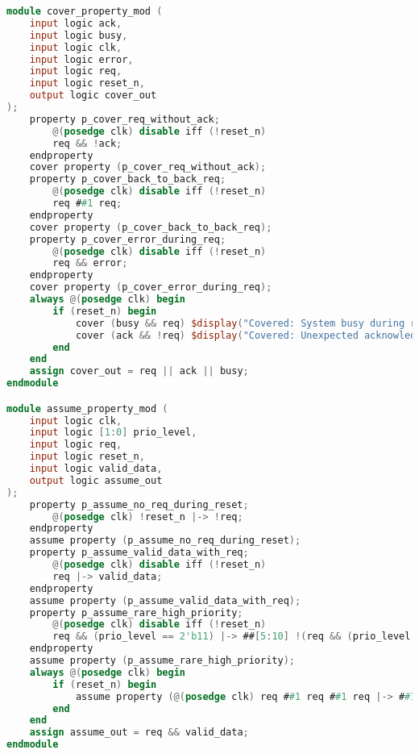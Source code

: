 \begin{lstlisting}[language=verilog,caption={Example of a snippet that targets Yosys's handling of assert and assume constructs.},label={lst:assert},breaklines=true]
module cover_property_mod (
    input logic ack,
    input logic busy,
    input logic clk,
    input logic error,
    input logic req,
    input logic reset_n,
    output logic cover_out
);
    property p_cover_req_without_ack;
        @(posedge clk) disable iff (!reset_n)
        req && !ack;
    endproperty
    cover property (p_cover_req_without_ack);
    property p_cover_back_to_back_req;
        @(posedge clk) disable iff (!reset_n)
        req ##1 req;
    endproperty
    cover property (p_cover_back_to_back_req);
    property p_cover_error_during_req;
        @(posedge clk) disable iff (!reset_n)
        req && error;
    endproperty
    cover property (p_cover_error_during_req);
    always @(posedge clk) begin
        if (reset_n) begin
            cover (busy && req) $display("Covered: System busy during request");
            cover (ack && !req) $display("Covered: Unexpected acknowledge");
        end
    end
    assign cover_out = req || ack || busy;
endmodule

module assume_property_mod (
    input logic clk,
    input logic [1:0] prio_level,
    input logic req,
    input logic reset_n,
    input logic valid_data,
    output logic assume_out
);
    property p_assume_no_req_during_reset;
        @(posedge clk) !reset_n |-> !req;
    endproperty
    assume property (p_assume_no_req_during_reset);
    property p_assume_valid_data_with_req;
        @(posedge clk) disable iff (!reset_n)
        req |-> valid_data;
    endproperty
    assume property (p_assume_valid_data_with_req);
    property p_assume_rare_high_priority;
        @(posedge clk) disable iff (!reset_n)
        req && (prio_level == 2'b11) |-> ##[5:10] !(req && (prio_level == 2'b11));
    endproperty
    assume property (p_assume_rare_high_priority);
    always @(posedge clk) begin
        if (reset_n) begin
            assume property (@(posedge clk) req ##1 req ##1 req |-> ##1 !req);
        end
    end
    assign assume_out = req && valid_data;
endmodule


\end{lstlisting}
